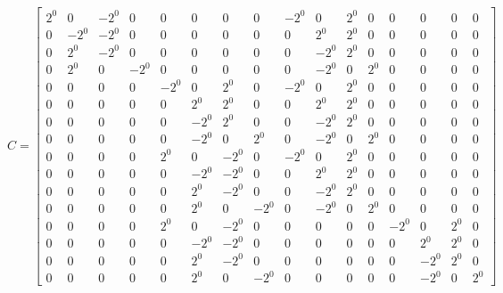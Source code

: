 \documentclass{article}%
\begin{document}
\[%
C = \left[\begin{array}{cccccccccccccccc}2^{0} & 0 & - 2^{0} & 0 & 0 & 0 & 0 & 0 & - 2^{0} & 0 & 2^{0} & 0 & 0 & 0 & 0 & 0\\0 & - 2^{0} & - 2^{0} & 0 & 0 & 0 & 0 & 0 & 0 & 2^{0} & 2^{0} & 0 & 0 & 0 & 0 & 0\\0 & 2^{0} & - 2^{0} & 0 & 0 & 0 & 0 & 0 & 0 & - 2^{0} & 2^{0} & 0 & 0 & 0 & 0 & 0\\0 & 2^{0} & 0 & - 2^{0} & 0 & 0 & 0 & 0 & 0 & - 2^{0} & 0 & 2^{0} & 0 & 0 & 0 & 0\\0 & 0 & 0 & 0 & - 2^{0} & 0 & 2^{0} & 0 & - 2^{0} & 0 & 2^{0} & 0 & 0 & 0 & 0 & 0\\0 & 0 & 0 & 0 & 0 & 2^{0} & 2^{0} & 0 & 0 & 2^{0} & 2^{0} & 0 & 0 & 0 & 0 & 0\\0 & 0 & 0 & 0 & 0 & - 2^{0} & 2^{0} & 0 & 0 & - 2^{0} & 2^{0} & 0 & 0 & 0 & 0 & 0\\0 & 0 & 0 & 0 & 0 & - 2^{0} & 0 & 2^{0} & 0 & - 2^{0} & 0 & 2^{0} & 0 & 0 & 0 & 0\\0 & 0 & 0 & 0 & 2^{0} & 0 & - 2^{0} & 0 & - 2^{0} & 0 & 2^{0} & 0 & 0 & 0 & 0 & 0\\0 & 0 & 0 & 0 & 0 & - 2^{0} & - 2^{0} & 0 & 0 & 2^{0} & 2^{0} & 0 & 0 & 0 & 0 & 0\\0 & 0 & 0 & 0 & 0 & 2^{0} & - 2^{0} & 0 & 0 & - 2^{0} & 2^{0} & 0 & 0 & 0 & 0 & 0\\0 & 0 & 0 & 0 & 0 & 2^{0} & 0 & - 2^{0} & 0 & - 2^{0} & 0 & 2^{0} & 0 & 0 & 0 & 0\\0 & 0 & 0 & 0 & 2^{0} & 0 & - 2^{0} & 0 & 0 & 0 & 0 & 0 & - 2^{0} & 0 & 2^{0} & 0\\0 & 0 & 0 & 0 & 0 & - 2^{0} & - 2^{0} & 0 & 0 & 0 & 0 & 0 & 0 & 2^{0} & 2^{0} & 0\\0 & 0 & 0 & 0 & 0 & 2^{0} & - 2^{0} & 0 & 0 & 0 & 0 & 0 & 0 & - 2^{0} & 2^{0} & 0\\0 & 0 & 0 & 0 & 0 & 2^{0} & 0 & - 2^{0} & 0 & 0 & 0 & 0 & 0 & - 2^{0} & 0 & 2^{0}\end{array}\right]%
\]%
\end{document}
